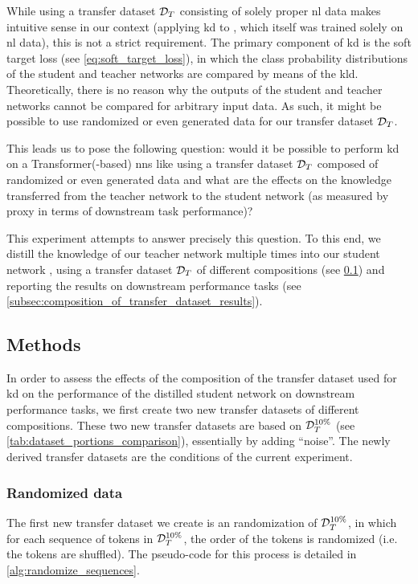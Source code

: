 While using a transfer dataset $\mathcal{D}_T$ consisting of solely proper \gls{nl} data makes intuitive sense in our context (applying \gls{kd} to \bertbase, which itself was trained solely on \gls{nl} data), this is not a strict requirement. The primary component of \gls{kd} is the soft target loss (see \cref{eq:soft_target_loss}), in which the class probability distributions of the student and teacher networks are compared by means of the \gls{kld}. Theoretically, there is no reason why the outputs of the student and teacher networks cannot be compared for arbitrary input data. As such, it might be possible to use randomized or even generated data for our transfer dataset $\mathcal{D}_T$.

This leads us to pose the following question: would it be possible to perform \gls{kd} on a Transformer(-based) \glspl{nn} like \bertbase using a transfer dataset $\mathcal{D}_T$ composed of randomized or even generated data and what are the effects on the knowledge transferred from the teacher network to the student network (as measured by proxy in terms of downstream task performance)?

This experiment attempts to answer precisely this question. To this end, we distill the knowledge of our teacher network \bertbase multiple times into our student network \bertstudent, using a transfer dataset $\mathcal{D}_T$ of different compositions (see \cref{subsec:composition_of_transfer_dataset_methods}) and reporting the results on downstream performance tasks (see \cref{subsec:composition_of_transfer_dataset_results}).



\subsection{Methods}
\label{subsec:composition_of_transfer_dataset_methods}
In order to assess the effects of the composition of the transfer dataset used for \gls{kd} on the performance of the distilled student network on downstream performance tasks, we first create two new transfer datasets of different compositions. These two new transfer datasets are based on $\mathcal{D}_T^{10\%}$ (see \cref{tab:dataset_portions_comparison}), essentially by adding ``noise''. The newly derived transfer datasets are the conditions of the current experiment.

\subsubsection{Randomized data}
The first new transfer dataset we create is an randomization of $\mathcal{D}_T^{10\%}$, in which for each sequence of tokens in $\mathcal{D}_T^{10\%}$, the order of the tokens is randomized (i.e. the tokens are shuffled). The pseudo-code for this process is detailed in \cref{alg:randomize_sequences}.

